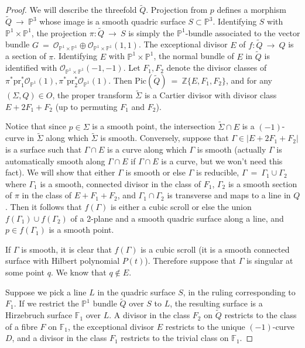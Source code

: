 \documentclass[twoside,12pt,reqno]{amsart}
\theoremstyle{plain}
\theoremstyle{definition}
\newcommand{\ZZ}{\mathbb{Z}}
\newcommand{\FF}{\mathbb{F}}
\newcommand{\PP}{\mathbb{P}}
\def\ps{\vspace{4pt}}
\newcommand{\OO}{\mathcal O}
\begin{document}
\begin{proof}
\ps

We will describe the
threefold $\tilde{Q}$.  Projection from $p$ defines a morphism
$\tilde{Q}~\rightarrow~ \PP^3$ whose image is a smooth quadric surface
$S\subset \PP^3$.  Identifying $S$ with $\PP^1\times \PP^1$, the projection
$\pi:\tilde{Q}~\rightarrow~ S$ is simply the $\PP^1$-bundle associated to
the vector bundle $G~=~\OO_{\PP^1\times\PP^1} \oplus \OO_{\PP^1\times
\PP^1}(1,1)$.  The exceptional divisor $E$ of $f:\tilde{Q}~\rightarrow~ Q$
is a section of $\pi$.  Identifying $E$ with $\PP^1\times \PP^1$, the
normal bundle of $E$ in $\tilde{Q}$ is identified with
$\OO_{\PP^1\times\PP^1}(-1,-1)$.  Let $F_1,F_2$ denote the divisor
classes of $\pi^*\text{pr}_1^*\OO_{\PP^1}(1), \pi^*\text{pr}_2^*\OO_{\PP^1}(1)$.
Then $\text{Pic}(\tilde{Q}) ~=~ \ZZ\{E,F_1,F_2\}$,  and for any $(\Sigma,Q)\in
O$, the proper transform $\widetilde{\Sigma}$ is a Cartier divisor with
divisor class $E+2F_1+F_2$ (up to permuting $F_1$ and $F_2$).  

\ps

Notice that since $p\in \Sigma$ is a smooth point, the intersection
$\widetilde{\Sigma}\cap E$ is a $(-1)$-curve in $\widetilde{\Sigma}$ along 
which $\widetilde{\Sigma}$ is smooth.
Conversely, suppose that $\Gamma\in |E+2F_1+F_2|$ is a surface
such that $\Gamma\cap E$ is a curve along which $\Gamma$ is smooth
(actually $\Gamma$ is automatically smooth along $\Gamma\cap E$ if
$\Gamma\cap E$ is a curve, but we won't need this fact).  We will show that
either $\Gamma$ is smooth or else 
$\Gamma$ is reducible, $\Gamma~=~\Gamma_1\cup \Gamma_2$ where $\Gamma_1$
is a smooth, connected divisor in the class of $F_1$,
$\Gamma_2$ is a smooth section of $\pi$ in the class of
$E+F_1+F_2$, and $\Gamma_1\cap \Gamma_2$ is transverse and maps to a
line in $Q$.  Then it follows that $f(\Gamma)$ is either a cubic
scroll or else the union $f(\Gamma_1)\cup f(\Gamma_2)$ of a 2-plane
and a smooth quadric surface along a line, and $p\in f(\Gamma_1)$ is a
smooth point.  

\ps

If $\Gamma$ is smooth, it is clear that $f(\Gamma)$ is a cubic scroll
(it is a smooth connected surface with Hilbert polynomial $P(t)$).
Therefore suppose that $\Gamma$ is singular at some point $q$.  We
know that 
$q\not\in E$.  

\ps

Suppose we pick a line $L$ in the quadric surface $S$, in the ruling 
corresponding to $F_1$.  If we restrict the $\PP^1$ bundle $\tilde{Q}$ over
$S$ to
$L$, the resulting surface is a Hirzebruch surface $\FF_1$ over $L$.  
A divisor
in the class $F_2$ on $\tilde{Q}$ restricts to the class of a fibre $F$ on 
$\FF_1$,
the exceptional divisor $E$ restricts to the unique $(-1)$-curve $D$, and a
divisor in the class $F_1$ restricts to the trivial class on $\FF_1$.


\end{proof}
\end{document}
